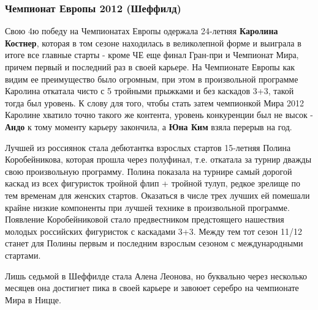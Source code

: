  
 
 
 
 

\subsubsection{Чемпионат Европы 2012 (Шеффилд)}

Свою 4ю победу на Чемпионатах Европы одержала 24-летняя \textbf{Каролина Костнер},
которая в том сезоне находилась в великолепной форме и выиграла в итоге все
главные старты - кроме ЧЕ еще финал Гран-при и Чемпионат Мира, причем первый и
последний раз в своей карьере. На Чемпионате Европы как видим ее преимущество
было огромным, при этом в произвольной программе Каролина откатала чисто с 5
тройными прыжками и без каскадов 3+3, такой тогда был уровень. К слову для
того, чтобы стать затем чемпионкой Мира 2012 Каролине хватило точно такого же
контента, уровень конкуренции был не высок - \textbf{Андо} к тому моменту карьеру
закончила, а \textbf{Юна Ким} взяла перерыв на год.


Лучшей из россиянок стала дебютантка взрослых стартов 15-летняя Полина
Коробейникова, которая прошла через полуфинал, т.е. откатала за турнир дважды
свою произвольную программу. Полина показала на турнире самый дорогой каскад из
всех фигуристок тройной флип + тройной тулуп, редкое зрелище по тем временам
для женских стартов. Оказаться в числе трех лучших ей помешали крайне низкие
компоненты при лучшей технике в произвольной программе. Появление
Коробейниковой стало предвестником предстоящего нашествия молодых российских
фигуристок с каскадами 3+3. Между тем тот сезон 11/12 станет для Полины первым
и последним взрослым сезоном с международными стартами.


Лишь седьмой в Шеффилде стала Алена Леонова, но буквально через несколько
месяцев она достигнет пика в своей карьере и завоюет серебро на чемпионате Мира
в Ницце.
